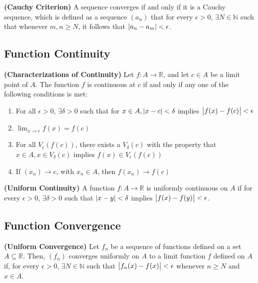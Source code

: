 \begin{theorem}
  \textbf{\textup{(Cauchy Criterion)}}
  A sequence converges if and only if it is a Cauchy sequence,
  which is defined as a sequence $(a_n)$ that for every $\epsilon > 0$,
  $\exists N \in \mathbb{N}$ such that whenever $m, n \geq N$,
  it follows that $\abs{a_n - a_m} < \epsilon$.
\end{theorem}

\subsection{Function Continuity}
\begin{theorem}
  \textbf{\textup{(Characterizations of Continuity)}}
  Let $f : A \to \mathbb{R}$, and let $c \in A$ be a limit point of $A$.
  The function $f$ is continuous at $c$ if and only if any one of the following 
  conditions is met:
  \begin{enumerate}[label=(\roman*)]
    \item For all $\epsilon > 0$, $\exists \delta > 0$ such that for $x \in A, \abs{x - c} < \delta$
    implies $\abs{f(x) - f(c)} < \epsilon$
    \item $\lim_{x \to c} f(x) = f(c)$
    \item For all $V_\epsilon(f(c))$, there exists a $V_\delta(c)$ with the property that 
    $x \in A, x \in V_\delta(c)$ implies $f(x) \in V_\epsilon(f(c))$
    \item If $(x_n) \to c$, with $x_n \in A$, then $f(x_n) \to f(c)$
  \end{enumerate}
\end{theorem}

\begin{theorem}
  \textbf{\textup{(Uniform Continuity)}}
  A function $f:A\to \mathbb{R}$ is uniformly continuous on $A$
  if for every $\epsilon > 0$, $\exists \delta > 0$
  such that $\abs{x - y} < \delta$ implies $\abs{f(x) - f(y)} < \epsilon$.
\end{theorem}

\subsection{Function Convergence}
\begin{definition}
  \textbf{\textup{(Uniform Convergence)}}
  Let $f_n$ be a sequence of functions defined on a set $A \subseteq \mathbb{R}$.
  Then, $(f_n)$ converges uniformly on $A$ to a limit function $f$
  defined on $A$ if, for every $\epsilon > 0$, $\exists N \in \mathbb{N}$
  such that $\abs{f_n(x) - f(x)} < \epsilon$ whenever $n \geq N$ and $x \in A$.
\end{definition}

